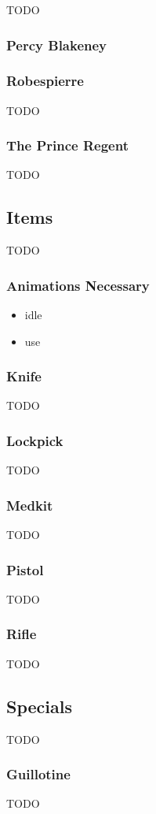 TODO

\subsubsection{Percy Blakeney}


\subsubsection{Robespierre}

TODO

\subsubsection{The Prince Regent}

TODO

\subsection{Items}

TODO

\subsubsection{Animations Necessary}

\begin{itemize}

\item idle
\item use

\end{itemize}

\subsubsection{Knife}

TODO

\subsubsection{Lockpick}

TODO

\subsubsection{Medkit}

TODO

\subsubsection{Pistol}

TODO

\subsubsection{Rifle}

TODO

\subsection{Specials}

TODO

\subsubsection{Guillotine}

TODO

